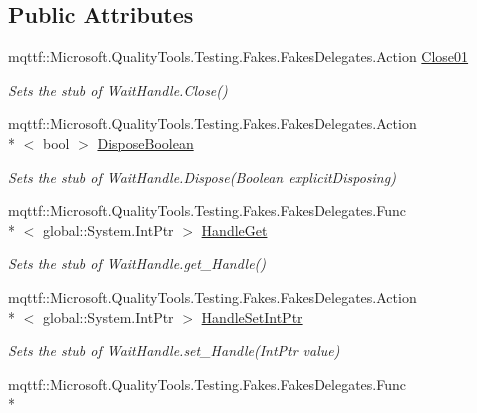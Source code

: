 \subsection*{Public Attributes}
\begin{DoxyCompactItemize}
\item 
mqttf\-::\-Microsoft.\-Quality\-Tools.\-Testing.\-Fakes.\-Fakes\-Delegates.\-Action \hyperlink{class_system_1_1_threading_1_1_fakes_1_1_stub_event_wait_handle_a396fefee6d119e2c15ef5172b7c0a720}{Close01}
\begin{DoxyCompactList}\small\item\em Sets the stub of Wait\-Handle.\-Close()\end{DoxyCompactList}\item 
mqttf\-::\-Microsoft.\-Quality\-Tools.\-Testing.\-Fakes.\-Fakes\-Delegates.\-Action\\*
$<$ bool $>$ \hyperlink{class_system_1_1_threading_1_1_fakes_1_1_stub_event_wait_handle_ac50e7ecfc3d86f939b2eac43b55fc3eb}{Dispose\-Boolean}
\begin{DoxyCompactList}\small\item\em Sets the stub of Wait\-Handle.\-Dispose(\-Boolean explicit\-Disposing)\end{DoxyCompactList}\item 
mqttf\-::\-Microsoft.\-Quality\-Tools.\-Testing.\-Fakes.\-Fakes\-Delegates.\-Func\\*
$<$ global\-::\-System.\-Int\-Ptr $>$ \hyperlink{class_system_1_1_threading_1_1_fakes_1_1_stub_event_wait_handle_a0d08681fa55764301d137acc04c22440}{Handle\-Get}
\begin{DoxyCompactList}\small\item\em Sets the stub of Wait\-Handle.\-get\-\_\-\-Handle()\end{DoxyCompactList}\item 
mqttf\-::\-Microsoft.\-Quality\-Tools.\-Testing.\-Fakes.\-Fakes\-Delegates.\-Action\\*
$<$ global\-::\-System.\-Int\-Ptr $>$ \hyperlink{class_system_1_1_threading_1_1_fakes_1_1_stub_event_wait_handle_a3f0621f746fe7504950008260fde1c7f}{Handle\-Set\-Int\-Ptr}
\begin{DoxyCompactList}\small\item\em Sets the stub of Wait\-Handle.\-set\-\_\-\-Handle(\-Int\-Ptr value)\end{DoxyCompactList}\item 
mqttf\-::\-Microsoft.\-Quality\-Tools.\-Testing.\-Fakes.\-Fakes\-Delegates.\-Func\\*

\end{DoxyCompactItemize}
